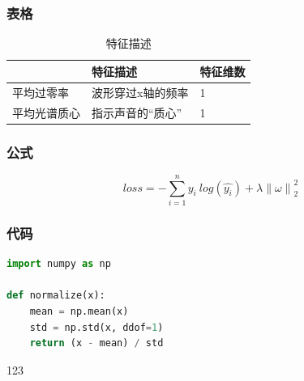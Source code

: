 \documentclass[UTF8,AutoFakeBold=1,AutoFakeSlant,zihao=-4]{cucthesis}
\begin{document}
\subsubsection{表格}
\begin{table}[ht]
    \centering\caption{特征描述}
    \begin{tabular}{lll}
    \toprule  \label{tab}
                 & 特征描述    & 特征维数      \\   \midrule
    平均过零率    & 波形穿过x轴的频率   & 1     \\
    平均光谱质心  & 指示声音的“质心”    & 1     \\  \bottomrule
    \end{tabular}
\end{table}


\subsubsection{公式}

\begin{equation}
    loss = - \sum_{i=1}^{n}{y_i\:log(\hat{y_i})} +     \label{eq:0}
    \lambda {\left\lVert\omega\right\rVert}_2^2
\end{equation}

\subsubsection{代码}

\begin{lstlisting}[language=Python]
import numpy as np

def normalize(x):
    mean = np.mean(x)
    std = np.std(x, ddof=1)
    return (x - mean) / std

\end{lstlisting}


\begin{references}
    
\end{references}


123
\end{document}
